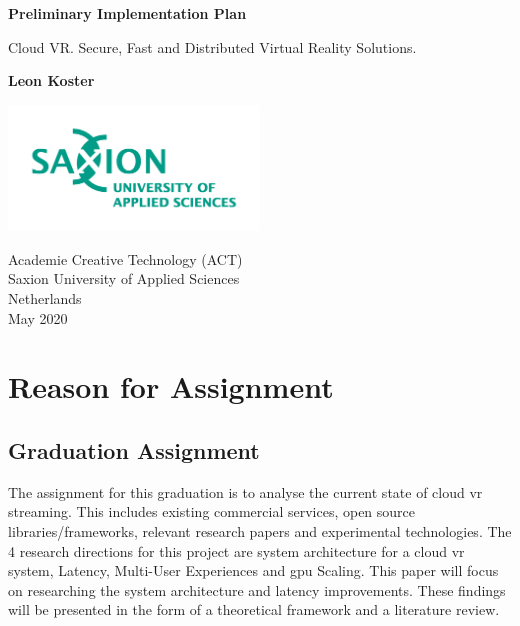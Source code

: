 \documentclass[]{article}
\begin{document}
\begin{titlepage}
   \begin{center}
       \vspace*{1cm}

       \textbf{Preliminary Implementation Plan}

       \vspace{0.5cm}
       Cloud VR. Secure, Fast and Distributed Virtual Reality Solutions.
       \vspace{1.5cm}

       \textbf{Leon Koster}

       \vfill
            
       \vspace{0.8cm}
     
      \includegraphics[width=0.5\textwidth]{university}
            
       Academie Creative Technology (ACT)\\
       Saxion University of Applied Sciences\\
       Netherlands\\
       May 2020
            
   \end{center}
\end{titlepage}

\tableofcontents
\printnoidxglossary[type=\acronymtype]


\section{Reason for Assignment}
\subsection{Graduation Assignment}
The assignment for this graduation is to analyse the current state of cloud \acrshort{vr} streaming. This includes existing commercial services, open source libraries/frameworks, relevant research papers and experimental technologies. The 4 research directions for this project are system architecture for a cloud \acrshort{vr} system, Latency, Multi-User Experiences and \acrshort{gpu} Scaling. This paper will focus on researching the system architecture and latency improvements. These findings will be presented in the form of a theoretical framework and a literature review.
\end{document}
